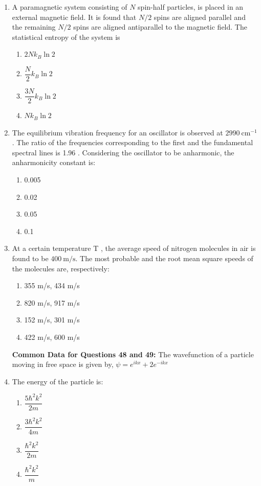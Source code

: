 \documentclass[journal,12pt,onecolumn]{IEEEtran}
\theoremstyle{remark}
\begin{document}
\begin{enumerate}
\item A paramagnetic system consisting of $N$ spin-half particles, is placed in an external magnetic field. It is found that $N/2$ spins are aligned parallel and the remaining $N/2$ spins are aligned antiparallel to the magnetic field. The statistical entropy of the system is
\begin{multicols}{2}
\begin{enumerate}
\item $ 2 N k_{B} \ln 2 $
    \item $ \dfrac{N}{2} k_{B} \ln 2 $
    \item  $\dfrac{3N}{2} k_{B} \ln 2 $
    \item  $N k_{B} \ln 2 $
\end{enumerate}
\end{multicols}

\item The equilibrium vibration frequency for an oscillator is observed at $ 2990 \ \mathrm{cm^{-1}} $. The ratio of the frequencies corresponding to the first and the fundamental spectral lines is  1.96 . Considering the oscillator to be anharmonic, the anharmonicity constant is:
\begin{multicols}{4}
\begin{enumerate}
    \item 0.005
    \item 0.02
    \item 0.05
     \item 0.1
\end{enumerate}
\end{multicols}
    


\item At a certain temperature  T , the average speed of nitrogen molecules in air is found to be $ 400 \ \mathrm{m/s} $. The most probable and the root mean square speeds of the molecules are, respectively:
\begin{multicols}{2}
\begin{enumerate}
    \item 355 m/s, 434 m/s
    \item 820 m/s, 917 m/s
    \item 152 m/s, 301 m/s
    \item 422 m/s, 600 m/s
\end{enumerate}
\end{multicols}
\textbf{Common Data for Questions 48 and 49:}
 The wavefunction of a particle moving in free space is given by,
$ \psi = e^{ikx} + 2 e^{-ikx} $
\item The energy of the particle is:
\begin{multicols}{2}
\begin{enumerate}
    \item $\dfrac{5\hbar^2 k^2}{2m} $
    \item $ \dfrac{3\hbar^2 k^2}{4m} $
    \item $ \dfrac{\hbar^2 k^2}{2m} $
    \item $ \dfrac{\hbar^2 k^2}{m} $
\end{enumerate}
\end{multicols}


\end{enumerate}
\end{document}
